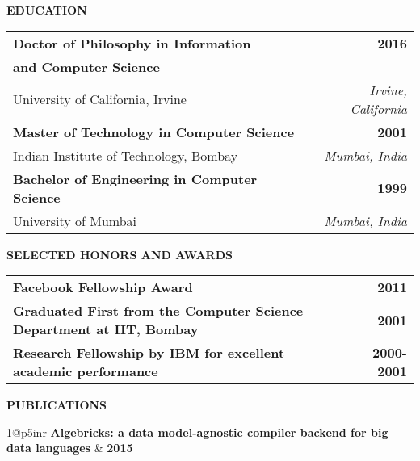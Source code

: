 \curriculumvitae
{

  \textbf{EDUCATION}

  \begin{tabular*}{1\textwidth}{@{\extracolsep{\fill}}lr}
    \textbf{Doctor of Philosophy in Information} & \textbf{2016} \\
    \textbf{and Computer Science} & \\
    \vspace{6pt}
    University of California, Irvine & \emph{Irvine, California} \\
    \textbf{Master of Technology in Computer Science} & \textbf{2001} \\
    \vspace{6pt}
    Indian Institute of Technology, Bombay & \emph{Mumbai, India} \\
    \textbf{Bachelor of Engineering in Computer Science} & \textbf{1999} \\
    \vspace{6pt}
    University of Mumbai & \emph{Mumbai, India} \\
  \end{tabular*}

  \vspace{12pt}
  \textbf{SELECTED HONORS AND AWARDS}

  \begin{tabular*}{1\textwidth}{@{\extracolsep{\fill}}lr}
    \textbf{Facebook Fellowship Award} & \textbf{2011} \\
    \textbf{Graduated First from the Computer Science Department at IIT, Bombay} & \textbf{2001} \\
    \textbf{Research Fellowship by IBM for excellent academic performance} & \textbf{2000-2001} \\
  \end{tabular*}

  \pagebreak

  \textbf{PUBLICATIONS}

  \begin{tabular*}{1\textwidth}{@{\extracolsep{\fill}}p{5in}r}
    \textbf{Algebricks: a data model-agnostic compiler backend for big data languages} & \textbf{2015} \\
     \vspace{6pt} \\


\end{tabular*}}
